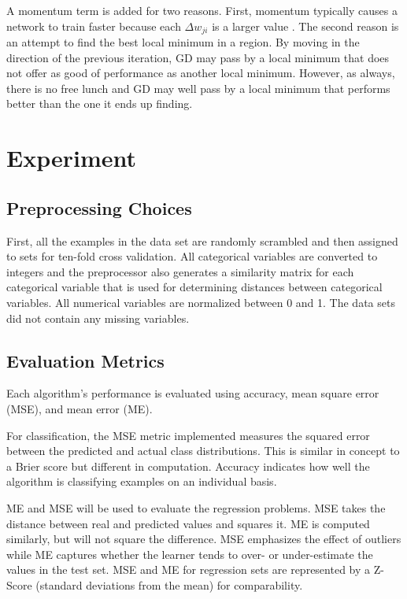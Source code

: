 \documentclass[twoside,11pt]{article}
\begin{document}
A momentum term is added for two reasons. First, momentum typically causes a network to train faster because each $\Delta w_{ji}$ is a larger value \citep{rumelhart1988learning}.
The second reason is an attempt to find the best local minimum in a region.
By moving in the direction of the previous iteration, GD may pass by a local minimum that does not offer as good of performance as another local minimum.
However, as always, there is no free lunch and GD may well pass by a local minimum that performs better than the one it ends up finding.

\section{Experiment}

\subsection{Preprocessing Choices}
First, all the examples in the data set are randomly scrambled and then assigned to sets
for ten-fold cross validation. All categorical variables are converted to integers and the
preprocessor also generates a similarity matrix for each categorical variable that is used for
determining distances between categorical variables. All numerical variables are normalized
between 0 and 1. The data sets did not contain any missing variables.

\subsection{Evaluation Metrics}
Each algorithm's performance is evaluated using accuracy, mean square error (MSE), and mean error (ME).

For classification, the MSE metric implemented measures the squared error between the predicted and actual class distributions. This is similar in concept to a Brier score but different in computation.  Accuracy indicates how well the algorithm is classifying examples on an individual basis.

ME and MSE will be used to evaluate the regression problems. MSE takes the distance between real and predicted values and squares it. ME is computed similarly, but will not square the difference. MSE emphasizes the effect of outliers while ME captures whether the learner tends to over- or under-estimate the values in the test set. MSE and ME for regression sets are represented by a Z-Score (standard deviations from the mean) for comparability.
\end{document}
